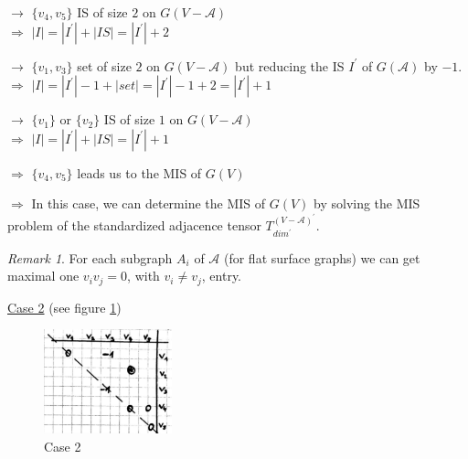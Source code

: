 \documentclass{article}
\newtheorem*{theorem A}{Theorem A}
\newtheorem*{theorem B}{N\"olker's Theorem}
\theoremstyle{remark}
\newtheorem{remark}{Remark}[section]
\theoremstyle{remark}
\begin{document}
\begin{enumerate}
    $\rightarrow$ $\{ v_{4}, v_{5} \}$ IS of size $2$ on $G\left(V - \mathcal{A}\right)$\\
        $\Rightarrow$ $|I| = |I^{\prime}| + |IS| = |I^{\prime}| + 2$

    \vspace{0.3cm}
    $\rightarrow$ $\{ v_{1}, v_{3} \}$ set of size $2$ on $G\left(V - \mathcal{A}\right)$ but reducing the IS $I^{\prime}$ of $G\left(\mathcal{A}\right)$ by $-1$.\\
        $\Rightarrow$ $|I| = |I^{\prime}| - 1 + |set| = |I^{\prime}| - 1 + 2 = |I^{\prime}| + 1$

    \vspace{0.3cm}
    $\rightarrow$ $\{ v_{1} \}$ or $\{ v_{2} \}$ IS of size $1$ on $G\left(V - \mathcal{A}\right)$\\
        $\Rightarrow$ $|I| = |I^{\prime}| + |IS| = |I^{\prime}| + 1$

    \vspace{0.3cm}
    $\Rightarrow$ $\{ v_{4}, v_{5} \}$ leads us to the MIS of $G\left(V\right)$

    \vspace{0.3cm}
    $\Rightarrow$ In this case, we can determine the MIS of $G\left(V\right)$ by solving the MIS problem of the standardized adjacence tensor $T^{\left(V - \mathcal{A}\right)^{\prime}}_{dim^{\prime}}$.


    \vspace{0.3cm}
    \begin{remark}
        For each subgraph $A_{i}$ of $\mathcal{A}$ (for flat surface graphs) we can get maximal one $v_{i}v_{j} = 0$, with $v_{i} \neq v_{j}$, entry.
    \label{remark:cases}
    \end{remark}

    

    \vspace{0.3cm}
    \underline{Case 2} (see figure \ref{fig:case2})\\

     \begin{figure}[ht]
	    \centering
        \includegraphics[width=0.33\textwidth]{images/case2.png}
	    \caption{Case 2}
	\label{fig:case2}
    \end{figure}


\end{enumerate}
\end{document}
